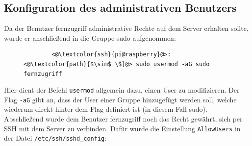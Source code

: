 \documentclass[a4paper, 12pt]{scrartcl}
\begin{document}
\subsection{Konfiguration des administrativen Benutzers}\label{ch:user_admincfg}
Da der Benutzer \glqq fernzugriff\grqq{} administrative Rechte auf dem Server erhalten sollte, wurde er anschließend in die Gruppe \glqq sudo\grqq{} aufgenommen:
\begin{figure}[H]
    \begin{mdframed}[backgroundcolor=bbg]
        \begin{lstlisting}
        <@\textcolor{ssh}{pi@raspberry}@>:<@\textcolor{path}{$\sim$ \$}@> sudo usermod -aG sudo fernzugriff
        \end{lstlisting}
    \end{mdframed}
    \label{lst:usermod_fernzugriff}
\end{figure}
Hier dient der Befehl \lstinline[basicstyle={\small\ttfamily\color{black}}]|usermod| allgemein dazu, einen User zu modifizieren. Der Flag \lstinline[basicstyle={\small\ttfamily\color{black}}]|-aG| gibt an,
dass der User einer Gruppe hinzugefügt werden soll, welche wiederum direkt hinter dem Flag definiert ist (in diesem Fall \glqq sudo\grqq).
\\
Abschließend wurde dem Benutzer \glqq fernzugriff\grqq{} noch das Recht gewährt, sich per SSH mit dem Server zu verbinden. Dafür wurde die Einstellung \lstinline[basicstyle={\small\ttfamily\color{black}}]|AllowUsers|
in der Datei \lstinline[basicstyle={\small\ttfamily\color{black}}]|/etc/ssh/sshd_config|:
\end{document}
